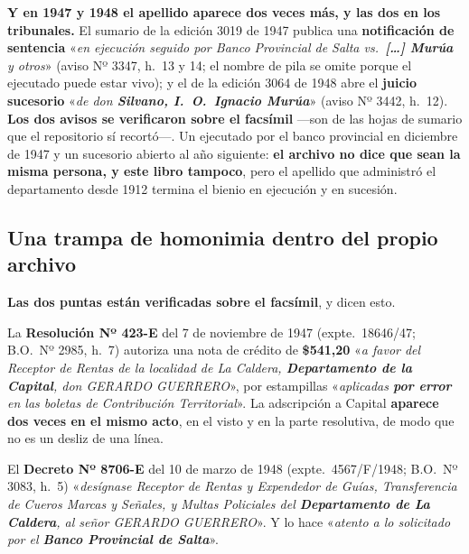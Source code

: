 \begin{cautela}
\textbf{Y en 1947 y 1948 el apellido aparece dos veces más, y las dos en los tribunales.} El
sumario de la edición 3019 de 1947 publica una \textbf{notificación de sentencia}
«\textit{en ejecución seguido por Banco Provincial de Salta vs.\ \textbf{[\ldots] Murúa} y
otros}» (aviso Nº 3347, h.\ 13 y 14; el nombre de pila se omite porque el ejecutado puede estar vivo); y el de la edición 3064 de 1948 abre el
\textbf{juicio sucesorio} «\textit{de don \textbf{Silvano, I.\ O.\ Ignacio Murúa}}» (aviso
Nº 3442, h.\ 12). \textbf{Los dos avisos se verificaron sobre el facsímil} ---son de las
hojas de sumario que el repositorio sí recortó---. Un ejecutado por el banco provincial en
diciembre de 1947 y un sucesorio abierto al año siguiente: \textbf{el archivo no dice que
sean la misma persona, y este libro tampoco}, pero el apellido que administró el
departamento desde 1912 termina el bienio en ejecución y en sucesión.
\end{cautela}

\subsection*{Una trampa de homonimia dentro del propio archivo}

\textbf{Las dos puntas están verificadas sobre el facsímil}, y dicen esto.

La \textbf{Resolución Nº 423-E} del 7 de noviembre de 1947 (expte.\ 18646/47; B.O.\ Nº 2985,
h.\ 7) autoriza una nota de crédito de \textbf{\$541,20} «\textit{a favor del Receptor de
Rentas de la localidad de La Caldera, \textbf{Departamento de la Capital}, don GERARDO
GUERRERO}», por estampillas «\textit{aplicadas \textbf{por error} en las boletas de
Contribución Territorial}». La adscripción a Capital \textbf{aparece dos veces en el mismo
acto}, en el visto y en la parte resolutiva, de modo que no es un desliz de una línea.

El \textbf{Decreto Nº 8706-E} del 10 de marzo de 1948 (expte.\ 4567/F/1948; B.O.\ Nº 3083,
h.\ 5) «\textit{desígnase Receptor de Rentas y Expendedor de Guías, Transferencia de Cueros
Marcas y Señales, y Multas Policiales del \textbf{Departamento de La Caldera}, al señor
GERARDO GUERRERO}». Y lo hace «\textit{atento a lo solicitado por el \textbf{Banco Provincial
de Salta}}».

